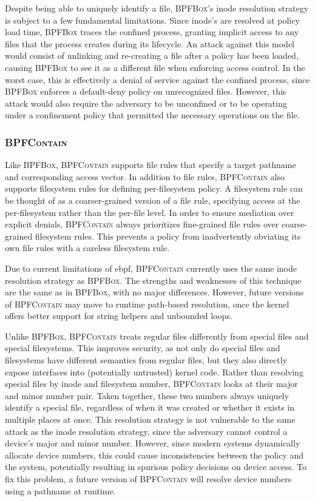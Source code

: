 \documentclass[
  fontsize=12pt,
  titlepage=firstiscover,
  paper=letter,
oneside,
  cleardoublepage=plain,
  parskip=half-,
  DIV=10,
  parindent,
  appendixprefix,
  chapterprefix,
  listof=totoc,
]{scrbook}
\newcommand{\bpfbox}{\textsc{BPFBox}}
\newcommand{\bpfcontain}{\textsc{BPFContain}}
\begin{document}
Despite being able to uniquely identify a file, \bpfbox{}'s inode resolution strategy is
subject to a few fundamental limitations. Since inode's are resolved at policy load time,
\bpfbox{} traces the confined process, granting implicit access to any files that the
process creates during its lifecycle.  An attack against this model would consist of
unlinking and re-creating a file after a policy has been loaded, causing \bpfbox{} to see
it as a different file when enforcing access control. In the worst case, this is
effectively a denial of service against the confined process, since \bpfbox{} enforces
a default-deny policy on unrecognized files. However, this attack would also require the
adversary to be unconfined or to be operating under a confinement policy that permitted
the necessary operations on the file.

\subsubsection{\bpfcontain{}}

Like \bpfbox{}, \bpfcontain{} supports file rules that specify a target pathname and
corresponding access vector. In addition to file rules, \bpfcontain{} also supports
filesystem rules for defining per-filesystem policy. A filesystem rule can be thought of
as a coarser-grained version of a file rule, specifying access at the per-filesystem
rather than the per-file level. In order to ensure mediation over explicit denials,
\bpfcontain{} always prioritizes fine-grained file rules over coarse-grained filesystem
rules. This prevents a policy from inadvertently obviating its own file rules with
a careless filesystem rule.

Due to current limitations of \gls{ebpf}, \bpfcontain{} currently uses the same inode
resolution strategy as \bpfbox{}. The strengths and weaknesses of this technique are the
same as in \bpfbox{}, with no major differences. However, future versions of \bpfcontain{}
may move to runtime path-based resolution, once the kernel offers better support for
string helpers and unbounded loops.

Unlike \bpfbox{}, \bpfcontain{} treats regular files differently from special files and
special filesystems. This improves security, as not only do special files and filesystems
have different semantics from regular files, but they also directly expose interfaces into
(potentially untrusted) kernel code. Rather than resolving special files by inode and
filesystem number, \bpfcontain{} looks at their major and minor number pair. Taken
together, these two numbers always uniquely identify a special file, regardless of when it
was created or whether it exists in multiple places at once. This resolution strategy is
not vulnerable to the same attack as the inode resolution strategy, since the adversary
cannot control a device's major and minor number. However, since modern systems
dynamically allocate device numbers, this could cause inconsistencies between the policy
and the system, potentially resulting in spurious policy decisions on device access. To
fix this problem, a future version of \bpfcontain{} will resolve device numbers using
a pathname at runtime.
\end{document}
